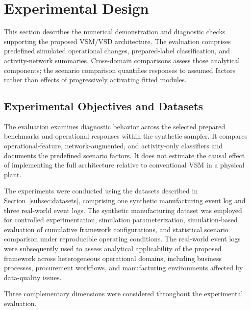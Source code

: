 \documentclass[pdflatex,iicol,Numbered,sn-basic]{sn-jnl}
\begin{document}
\section{Experimental Design}
\label{sec:experimental_design}

This section describes the numerical demonstration and diagnostic checks supporting the proposed VSM/VSD architecture. The evaluation comprises predefined simulated operational changes, prepared-label classification, and activity-network summaries. Cross-domain comparisons assess those analytical components; the scenario comparison quantifies responses to assumed factors rather than effects of progressively activating fitted modules.

\subsection{Experimental Objectives and Datasets}
\label{subsec:experimental_objectives}

The evaluation examines diagnostic behavior across the selected prepared benchmarks and operational responses within the synthetic sampler. It compares operational-feature, network-augmented, and activity-only classifiers and documents the predefined scenario factors. It does not estimate the causal effect of implementing the full architecture relative to conventional VSM in a physical plant.

The experiments were conducted using the datasets described in Section~\ref{subsec:datasets}, comprising one synthetic manufacturing event log and three real-world event logs. The synthetic manufacturing dataset was employed for controlled experimentation, simulation parameterization, simulation-based evaluation of cumulative framework configurations, and statistical scenario comparison under reproducible operating conditions. The real-world event logs were subsequently used to assess analytical applicability of the proposed framework across heterogeneous operational domains, including business processes, procurement workflows, and manufacturing environments affected by data-quality issues.

Three complementary dimensions were considered throughout the experimental evaluation.
\end{document}
